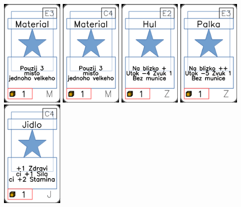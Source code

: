 \documentclass[a4paper]{article}
\begin{document}
	\includegraphics[width=3.0cm]{img-1_52}
	\includegraphics[width=3.0cm]{img-1_43}
	\includegraphics[width=3.0cm]{img-1_81}
	\includegraphics[width=3.0cm]{img-1_82}
	\includegraphics[width=3.0cm]{img-1_13}
\end{document}
